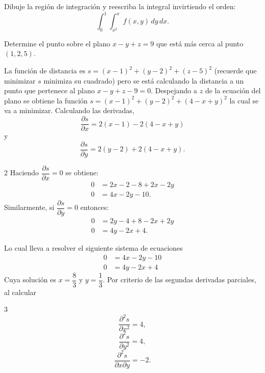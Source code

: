 \begin{prob}
Dibuje la región de integración y reescriba la integral invirtiendo el orden:
\[
\int_0^1\int_{x^2}^{x} f(x,y)\,dy\,dx.
\]
\end{prob}




\begin{prob}
Determine el punto sobre el plano $x-y+z=9$ que está más cerca al punto $(1,2,5).$
\begin{myproof}
La función de distancia es $s=(x-1)^2+(y-2)^2+(z-5)^2$ (recuerde que minimizar $s$ minimiza su cuadrado) pero se está calculando la distancia a un punto que pertenece al plano $x-y+z-9=0.$ Despejando a $z$ de la ecuación del plano se obtiene la función $s=(x-1)^2+(y-2)^2+(4-x+y)^2$ la cual se va a minimizar.
Calculando las derivadas, $$\dfrac{\partial s}{\partial x}=2(x-1)-2(4-x+y)$$ y  $$\dfrac{\partial s}{\partial y}=2(y-2)+2(4-x+y).$$
\begin{multicols}{2}
Haciendo $\dfrac{\partial s}{\partial x}=0$ se obtiene:
\begin{align*}
0&=2x-2-8+2x-2y\\
0&=4x-2y-10.
\end{align*}
\columnbreak
Similarmente, si $\dfrac{\partial s}{\partial y}=0$ entonces:
\begin{align*}
0&=2y-4+8-2x+2y\\
0&=4y-2x+4.
\end{align*}
\end{multicols}
Lo cual lleva a resolver el siguiente sistema de ecuaciones
\begin{align*}
0&=4x-2y-10\\0&=4y-2x+4
\end{align*}
Cuya solución es $x=\dfrac{8}{3}$ y $y=\dfrac{1}{3}.$
Por criterio de las segundas derivadas parciales, al calcular 
\begin{multicols}{3}
$$\dfrac{\partial^2 s}{\partial x^2}=4,$$ $$\dfrac{\partial^2 s}{\partial y^2}=4,$$ $$\dfrac{\partial^2 s}{\partial x\partial y}=-2.$$
\end{multicols}

\end{myproof}
\end{prob}
